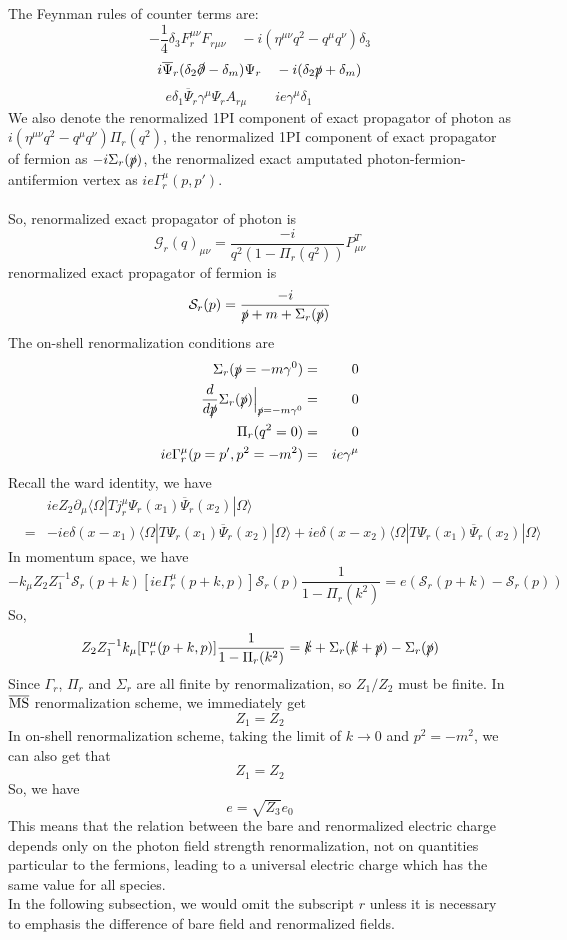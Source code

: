 The Feynman rules of counter terms are:
\[-\frac{1}{4}\delta_3 F_r^{\mu\nu}F_{r\mu\nu} \quad  -i(\eta^{\mu\nu}q^2-q^{\mu}q^{\nu})\delta_3\]
\[i\overline{\Psi}_r (\delta_{2}\slashed{\partial} - \delta_m)\Psi_r \quad -i(\delta_2\slashed{p}+\delta_m)\]
\[ e \delta_1 \overline{\Psi}_r\gamma^{\mu}\Psi_r A_{r\mu} \quad \quad ie \gamma^{\mu}\delta_1 \quad \quad  \quad \]
We also denote the renormalized 1PI component of exact propagator of photon as $i(\eta^{\mu\nu}q^2 -q^{\mu}q^{\nu})\Pi_r(q^2)$, the renormalized 1PI component of exact propagator of fermion as $-i\Sigma_r(\slashed{p})$, the renormalized exact amputated photon-fermion-antifermion vertex as $ie\Gamma^{\mu}_r(p,p')$. 
\\ \\
So, renormalized exact propagator of photon is
\[\mathcal{G}_r(q)_{\mu\nu} = \frac{-i}{q^2(1-\Pi_r(q^2))}P^T_{\mu\nu}\]
renormalized exact propagator of fermion is
\[\mathcal{S}_r(p) = \frac{-i}{\slashed{p}+m+\Sigma_r(\slashed{p})}\]
The on-shell renormalization conditions are
\begin{eqnarray}
\Sigma_r(\slashed{p}=-m\gamma^0) &=& 0 \nonumber \\
\frac{d}{d\slashed{p}} \Sigma_r(\slashed{p}) \Big|_{\slashed{p} = -m\gamma^0} &=& 0 \nonumber \\
\Pi_r(q^2 = 0) &=& 0 \nonumber \\
ie\Gamma^{\mu}_r(p=p',p^2=-m^2) &=& ie\gamma^{\mu} \nonumber
\end{eqnarray}
Recall the ward identity, we have
\begin{eqnarray}
&\phantom{=}& ieZ_2\partial_{\mu} \langle \Omega | T j_r^{\mu} \Psi_r(x_1) \overline{\Psi}_r(x_2)| \Omega\rangle \nonumber \\
&=& -ie\delta(x-x_1)\langle \Omega | T \Psi_r(x_1) \overline{\Psi}_r(x_2)| \Omega\rangle + ie\delta(x-x_2)\langle \Omega | T \Psi_r(x_1) \overline{\Psi}_r(x_2)| \Omega\rangle \nonumber
\end{eqnarray}
In momentum space, we have
\[-k_{\mu} Z_2 Z_1^{-1} \mathcal{S}_r(p+k) [ie\Gamma^{\mu}_r(p+k,p)] \mathcal{S}_r(p) \frac{1}{1-\Pi_r(k^2)} = e(\mathcal{S}_r(p+k) - \mathcal{S}_r(p)) \]
So,
\[Z_2 Z_1^{-1} k_{\mu} [\Gamma^{\mu}_r(p+k,p)] \frac{1}{1-\Pi_r(k^2)} =\slashed{k}+\Sigma_r(\slashed{k}+\slashed{p})-\Sigma_r(\slashed
{p})\]
Since $\Gamma_r$, $\Pi_r$ and $\Sigma_r$ are all finite by renormalization, so $Z_1/Z_2$ must be finite.
In $\overline{\rm MS}$ renormalization scheme, we immediately get
\[Z_1 = Z_2\]
In on-shell renormalization scheme, taking the limit of $k \to 0$ and $p^2 = -m^2$, we can also get that
\[Z_1 = Z_2\]
So, we have
\[e = \sqrt{Z_3}e_0\]
This means that the relation between the bare and renormalized electric charge depends only on the photon field strength renormalization, not on quantities particular to the fermions, leading to a universal electric charge which has the same value for all species.\\
In the following subsection, we would omit the subscript $r$ unless it is necessary to emphasis the difference of bare field and renormalized fields.


